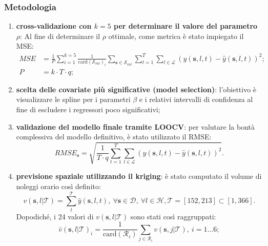 \begin{frame}
	\frametitle{Metodologia}
	\centering
	\begin{enumerate}
		\justifying
		\item \textbf{cross-validazione con $k=5$ per determinare il valore del parametro $\rho$}: Al fine di determinare il $\rho$ ottimale, come metrica è stato impiegato il MSE:
			\begin{equation*}
			\begin{aligned}
				MSE &= \frac{1}{P}\sum_{i=1}^{k=5}\frac{1}{\text{card}(\mathcal{S}_{val})_i}\sum_{\mathbf{s}\in\mathcal{S}_{val}}^{}\sum_{t=1}^{T}\sum_{l\in\mathcal{L}}^{} (y(\mathbf{s}, l, t) - \hat{y}(\mathbf{s}, l, t))^2; \\
				P &= k\cdot T\cdot q;
			\end{aligned}
		\end{equation*}
		\item \textbf{scelta delle covariate più significative (model selection)}: l'obiettivo è visualizzare le spline per i parametri $\beta$ e i relativi intervalli di confidenza al fine di escludere i regressori poco significativi;

	\end{enumerate}	
\end{frame}
\begin{frame}
	\centering
	
	\begin{enumerate}
		\setcounter{enumi}{2}
		\justifying
		\item \textbf{validazione del modello finale tramite LOOCV}: per valutare la bontà complessiva del modello definitivo, è stato utilizzato il RMSE:
		\begin{equation*}
			RMSE_\mathbf{s} = \sqrt{\frac{1}{T\cdot q}\sum_{t=1}^{T}\sum_{l\in\mathcal{L}}^{} (y(\mathbf{s}, l, t) - \hat{y}(\mathbf{s}, l, t))^2}.
		\end{equation*}
		\item \textbf{previsione spaziale utilizzando il kriging}: è stato computato il volume di noleggi orario così definito:
		\begin{equation*}
			v(\mathbf{s}, l|\mathcal{T}) = \sum_{t}^{\mathcal{T}} \hat{y}(\mathbf{s}, l, t), \ \forall \mathbf{s}\in\mathcal{D}, \ \forall l\in\mathcal{H}, \mathcal{T} = [152, 213]\subset [1, 366].
		\end{equation*}
			Dopodiché, i \num{24} valori di $v(\mathbf{s}, l|\mathcal{T})$ sono stati così raggruppati:
		\begin{equation*}
			\bar{v}(\mathbf{s}, l|\mathcal{T})_i = \frac{1}{\text{card}(\mathcal{R}_i)}\sum_{j\in\mathcal{R}_i}^{}v(\mathbf{s}, j|\mathcal{T}), \ i=1\dots 6;
		\end{equation*}
	\end{enumerate}	
\end{frame}

